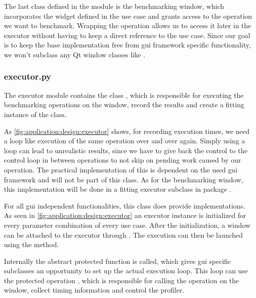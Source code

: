 

The last class defined in the module is the benchmarking window, which
incorporates the widget defined in the use case and grants access to the
operation we want to benchmark. Wrapping the operation allows us to access it
later in the executor without having to keep a direct reference to the use case.
Since our goal is to keep the base implementation free from \gls{gui} framework
specific functionality, we won't subclass any Qt window classes like
.

\subsubsection*{executor.py}

The executor module contains the class
, which is responsible for executing
the benchmarking operations on the window, record the results and create a
fitting instance of the  class.

As \ref{fig:application:design:executor} shows, for recording execution times,
we need a loop like execution of the same operation over and over again. Simply
using a loop can lead to unrealistic results, since we have to give back the
control to the control loop in between operations to not skip on pending work
caused by our operation. The practical implementation of this is dependent on
the used \gls{gui} framework and will not be part of this class. As for the
benchmarking window, this implementation will be done in a fitting executor
subclass in package .

For all \gls{gui} independent functionalities, this class does provide
implementations. As seen in \ref{fig:application:design:executor} an executor
instance is initialized for every parameter combination of every use case. After
the initialization, a window can be attached to the executor through
. The execution can then be launched using the
 method. 



Internally the abstract protected function  is
called, which gives \gls{gui} specific subclasses an opportunity to set up the
actual execution loop. This loop can use the protected operation
, which is responsible for calling the
operation on the window, collect timing information and control the profiler.

